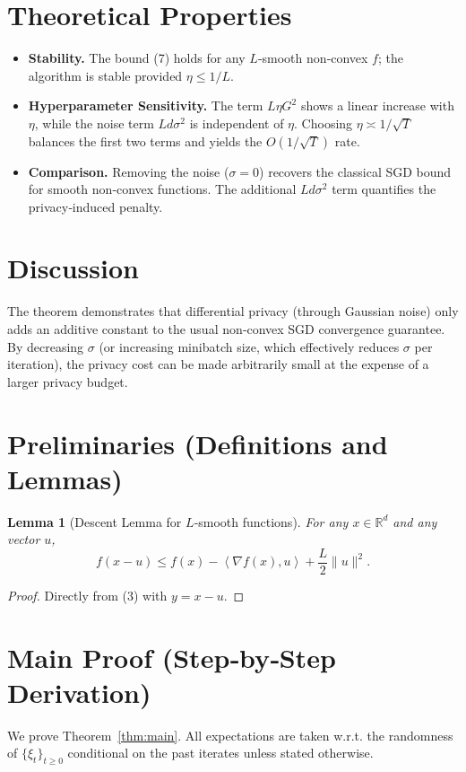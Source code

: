 \documentclass{article}
\newtheorem{lemma}{Lemma}
\newcommand{\R}{\mathbb{R}}
\newcommand{\ip}[2]{\left\langle #1,#2\right\rangle}
\begin{document}
\section*{Theoretical Properties}
\begin{itemize}
\item \textbf{Stability.} The bound (7) holds for any $L$‑smooth non‑convex $f$; the algorithm is stable provided $\eta\le 1/L$.
\item \textbf{Hyperparameter Sensitivity.} The term $L\eta G^{2}$ shows a linear increase with $\eta$, while the noise term $L d\sigma^{2}$ is independent of $\eta$. Choosing $\eta\asymp 1/\sqrt{T}$ balances the first two terms and yields the $O(1/\sqrt{T})$ rate.
\item \textbf{Comparison.} Removing the noise ($\sigma=0$) recovers the classical SGD bound for smooth non‑convex functions. The additional $L d\sigma^{2}$ term quantifies the privacy‑induced penalty.
\end{itemize}

\section*{Discussion}
The theorem demonstrates that differential privacy (through Gaussian noise) only adds an additive constant to the usual non‑convex SGD convergence guarantee. By decreasing $\sigma$ (or increasing minibatch size, which effectively reduces $\sigma$ per iteration), the privacy cost can be made arbitrarily small at the expense of a larger privacy budget.

\newpage

\section*{Preliminaries (Definitions and Lemmas)}
\begin{lemma}[Descent Lemma for $L$‑smooth functions]\label{lem:descent}
For any $x\in\R^{d}$ and any vector $u$,
\[
f(x-u)\le f(x)-\ip{\nabla f(x)}{u}+ \frac{L}{2}\|u\|^{2}.
\tag{8}
\]
\end{lemma}
\begin{proof}
Directly from (3) with $y=x-u$.
\end{proof}

\section*{Main Proof (Step‑by‑Step Derivation)}
We prove Theorem~\ref{thm:main}.  
All expectations are taken w.r.t. the randomness of $\{\xi_{t}\}_{t\ge0}$ conditional on the past iterates unless stated otherwise.
\end{document}
